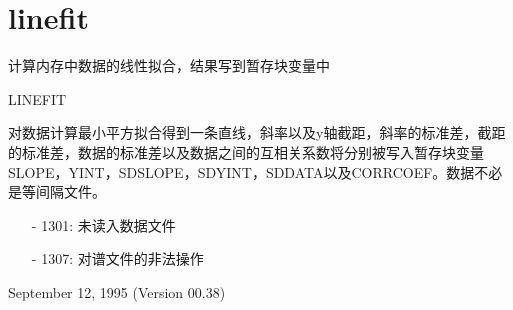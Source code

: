 \section{linefit}
\label{cmd:linefit}

计算内存中数据的线性拟合，结果写到暂存块变量中

LINEFIT

对数据计算最小平方拟合得到一条直线，斜率以及y轴截距，斜率的标准差，截距的标准差，数据的标准差以及数据之间的互相关系数将分别被写入暂存块变量SLOPE，YINT，SDSLOPE，SDYINT，SDDATA以及CORRCOEF。数据不必是等间隔文件。

\begin{itemize}
\item[-]1301: 未读入数据文件
\item[-]1307: 对谱文件的非法操作
\end{itemize}

September 12, 1995 (Version 00.38)
